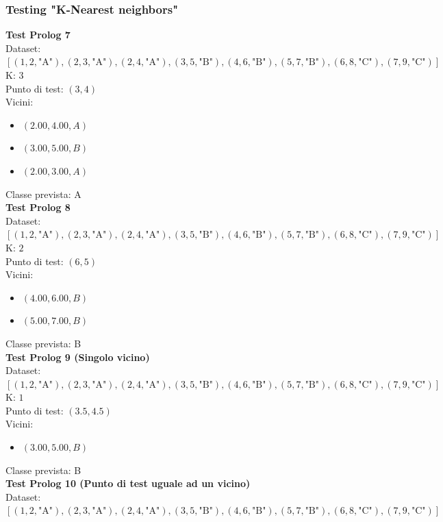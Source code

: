 \documentclass[11pt]{article}
\theoremstyle{definition}
\begin{document}
\subsubsection{Testing "K-Nearest neighbors"}
\textbf{Test Prolog 7}\\
Dataset: $[(1, 2, \text{"A"}), (2, 3, \text{"A"}), (2, 4, \text{"A"}), (3, 5, \text{"B"}), (4, 6, \text{"B"}), (5, 7, \text{"B"}), (6, 8, \text{"C"}), (7, 9, \text{"C"})]$\\
K: $3$\\
Punto di test: $(3, 4)$\\
Vicini:
\begin{itemize}
\item $(2.00,4.00, A)$
\item $(3.00,5.00, B)$
\item $(2.00,3.00, A)$
\end{itemize}
Classe prevista: A\\
\newline
\textbf{Test Prolog 8}\\
Dataset: $[(1, 2, \text{"A"}), (2, 3, \text{"A"}), (2, 4, \text{"A"}), (3, 5, \text{"B"}), (4, 6, \text{"B"}), (5, 7, \text{"B"}), (6, 8, \text{"C"}), (7, 9, \text{"C"})]$\\
K: $2$\\
Punto di test: $(6, 5)$\\
Vicini:
\begin{itemize}
\item $(4.00,6.00, B)$
\item $(5.00,7.00, B)$
\end{itemize}
Classe prevista: B\\
\newline
\textbf{Test Prolog 9 (Singolo vicino)}\\
Dataset: $[(1, 2, \text{"A"}), (2, 3, \text{"A"}), (2, 4, \text{"A"}), (3, 5, \text{"B"}), (4, 6, \text{"B"}), (5, 7, \text{"B"}), (6, 8, \text{"C"}), (7, 9, \text{"C"})]$\\
K: $1$\\
Punto di test: $(3.5, 4.5)$\\
Vicini:
\begin{itemize}
\item $(3.00,5.00, B)$
\end{itemize}
Classe prevista: B\\
\newline
\textbf{Test Prolog 10 (Punto di test uguale ad un vicino)}\\
Dataset: $[(1, 2, \text{"A"}), (2, 3, \text{"A"}), (2, 4, \text{"A"}), (3, 5, \text{"B"}), (4, 6, \text{"B"}), (5, 7, \text{"B"}), (6, 8, \text{"C"}), (7, 9, \text{"C"})]$\\
\end{document}

